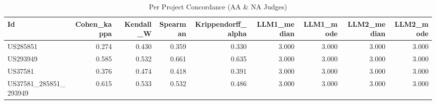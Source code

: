 \begin{table}
\caption{Per Project Concordance (AA & NA Judges)}
\label{tab:per_project_concordance_AA_NA_judges}
\begin{tabular}{lrrrrrrrr}
\toprule
Id & Cohen_kappa & Kendall_W & Spearman & Krippendorff_alpha & LLM1_median & LLM1_mode & LLM2_median & LLM2_mode \\
\midrule
US285851 & 0.274 & 0.430 & 0.359 & 0.330 & 3.000 & 3.000 & 3.000 & 3.000 \\
US293949 & 0.585 & 0.532 & 0.661 & 0.635 & 3.000 & 3.000 & 3.000 & 3.000 \\
US37581 & 0.376 & 0.474 & 0.418 & 0.391 & 3.000 & 3.000 & 3.000 & 3.000 \\
US37581_285851_293949 & 0.615 & 0.533 & 0.532 & 0.486 & 3.000 & 3.000 & 3.000 & 3.000 \\
\bottomrule
\end{tabular}
\end{table}
